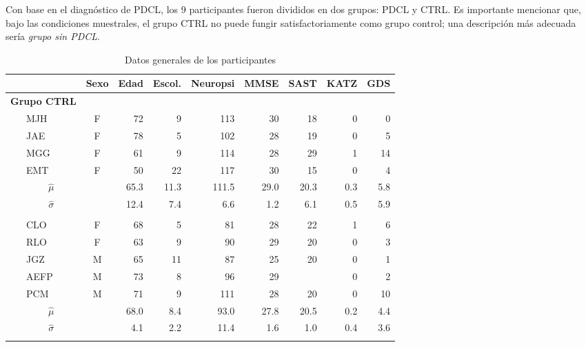 \documentclass[12pt,letterpaper]{book}
\newcommand{\pz}{\phantom{.0}}
\newcommand{\bordes}[1]{\renewcommand{\arraystretch}{#1}}
\newcommand{\midrulec}{%
  \arrayrulecolor{gris}\specialrule{\aboverulesep}{0pt}{0pt}
  \arrayrulecolor{black}\specialrule{\lightrulewidth}{0pt}{\belowrulesep}
}
\newcommand{\bottomrulec}{%
  \arrayrulecolor{black}
  \arrayrulecolor{gris}\specialrule{\belowrulesep}{0pt}{0pt}
  \arrayrulecolor{black}\specialrule{\lightrulewidth}{0pt}{\belowrulesep}
}
\begin{document}
Con base en el diagnóstico de PDCL, los 9 participantes fueron divididos en dos grupos: PDCL y CTRL. 
%
Es importante mencionar que, bajo las condiciones muestrales, el grupo CTRL no puede fungir satisfactoriamente como grupo control; una descripción más adecuada sería \textit{grupo sin PDCL}.

\begin{table}
\caption{Datos generales de los participantes}
\centering
\bordes{1.1}
{\small
\begin{tabular}{llcrrrrrrr}
\toprule
 \phantom{mmm}&
 & {Sexo} & {Edad} & {Escol.} & {Neuropsi} & {MMSE} & {SAST} & {KATZ} & {GDS} \\
\midrule
\multicolumn{2}{l}{\textbf{Grupo CTRL}}\\
&MJH    & F    & 72\pz & 9\pz  & 113\pz & 30\pz & 18\pz & 0\pz & 0\pz  \\
&JAE    & F    & 78\pz & 5\pz  & 102\pz & 28\pz & 19\pz & 0\pz & 5\pz  \\
&MGG    & F    & 61\pz & 9\pz  & 114\pz & 28\pz & 29\pz & 1\pz & 14\pz \\
&EMT    & F    & 50\pz & 22\pz & 117\pz & 30\pz & 15\pz & 0\pz & 4\pz  \\
\rowcolor{gris}
&\multicolumn{1}{c}{$\widehat{\mu}$} & 
               & 65.3  & 11.3  & 111.5  & 29.0  & 20.3  & 0.3  & 5.8  \\
\rowcolor{gris}
&\multicolumn{1}{c}{$\widehat{\sigma}$} & 
               & 12.4  & 7.4   & 6.6    & 1.2   & 6.1   & 0.5  & 5.9  \\
\midrulec
\multicolumn{2}{l}{\textbf{Grupo PDCL}}\\
& CLO   & F    & 68\pz &  5\pz &  81\pz & 28\pz & 22\pz & 1\pz &  6\pz \\
& RLO   & F    & 63\pz &  9\pz &  90\pz & 29\pz & 20\pz & 0\pz &  3\pz \\
& JGZ   & M    & 65\pz & 11\pz &  87\pz & 25\pz & 20\pz & 0\pz &  1\pz \\
& AEFP  & M    & 73\pz &  8\pz &  96\pz & 29\pz &   \pz & 0\pz &  2\pz \\
& PCM   & M    & 71\pz &  9\pz & 111\pz & 28\pz & 20\pz & 0\pz & 10\pz \\
\rowcolor{gris}
&\multicolumn{1}{c}{$\widehat{\mu}$} & 
              &  68.0  & 8.4   & 93.0   & 27.8  & 20.5  & 0.2  & 4.4  \\
\rowcolor{gris}
&\multicolumn{1}{c}{$\widehat{\sigma}$} & 
              & 4.1    & 2.2   & 11.4   & 1.6   & 1.0   & 0.4  & 3.6 \\
\bottomrulec
\end{tabular} 
}
\label{tab_sujetos}
\end{table}
\end{document}
